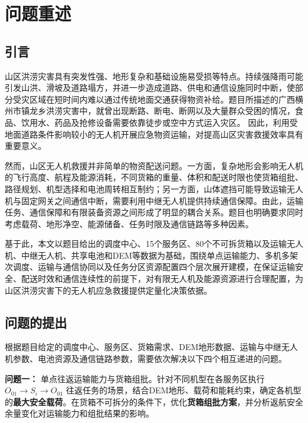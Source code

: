 \documentclass[bwprint,fontset=fandol]{gmcmthesis}
\begin{document}
\pagestyle{plain}

\maketoc

\clearpage

\section{问题重述}

\subsection{引言}   %
山区洪涝灾害具有突发性强、地形复杂和基础设施易受损等特点。持续强降雨可能引发山洪、滑坡及道路塌方，并进一步造成道路、供电和通信设施同时中断，使部分受灾区域在短时间内难以通过传统地面交通获得物资补给。题目所描述的广西横州市镇龙乡洪涝灾害中，就曾出现断路、断电、断网以及大量群众受困的情况，食品、饮用水、药品及抢修设备需要依靠徒步或空中方式运入灾区。 因此，利用受地面道路条件影响较小的无人机开展应急物资运输，对提高山区灾害救援效率具有重要意义。

然而，山区无人机救援并非简单的物资配送问题。一方面，复杂地形会影响无人机的飞行高度、航程及能源消耗，不同货箱的重量、体积和配送时限也使货箱组批、路径规划、机型选择和电池周转相互制约；另一方面，山体遮挡可能导致运输无人机与固定网关之间通信中断，需要利用中继无人机提供持续通信保障。由此，运输任务、通信保障和有限装备资源之间形成了明显的耦合关系。题目也明确要求同时考虑载荷、地形净空、能源储备、任务时限及通信链路等多种因素。

基于此，本文以题目给出的调度中心、15个服务区、80个不可拆货箱以及运输无人机、中继无人机、共享电池和DEM等数据为基础，围绕单点运输能力、多机多架次调度、运输与通信协同以及任务分区资源配置四个层次展开建模，在保证运输安全、配送时效和通信连续性的前提下，对有限无人机及能源资源进行合理配置，为山区洪涝灾害下的无人机应急救援提供定量化决策依据。
\subsection{问题的提出}


\noindent 根据题目给定的调度中心、服务区、货箱需求、DEM地形数据、运输与中继无人机参数、电池资源及通信链路参数，需要依次解决以下四个相互递进的问题。

\textbf{问题一：} 单点往返运输能力与货箱组批。针对不同机型在各服务区执行
$O_{01}\rightarrow S_i\rightarrow O_{01}$
往返任务的场景，结合DEM地形、载荷和能耗约束，确定各机型的\textbf{最大安全载荷}。在货箱不可拆分的条件下，优化\textbf{货箱组批方案}，并分析返航安全余量变化对运输能力和组批结果的影响。
\end{document}
